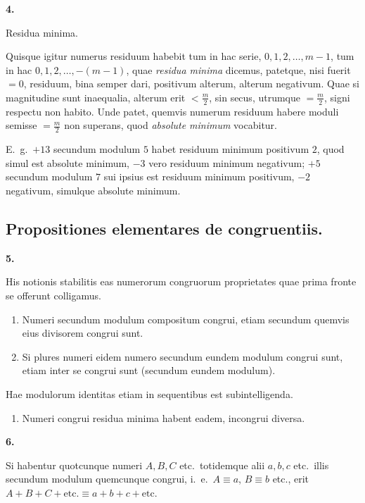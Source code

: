 \documentclass[12pt,a4paper]{article}
\theoremstyle{plain}
\theoremstyle{definition}
\theoremstyle{remark}
\begin{document}
\vspace{0.5em}
\textbf{4.}

Residua minima.

Quisque igitur numerus residuum habebit tum in hac serie, $0, 1, 2, \ldots, m - 1$, tum in hac $0, 1, 2, \ldots, -(m-1)$, quae \emph{residua minima} dicemus, patetque, nisi fuerit $= 0$, residuum, bina semper dari, positivum alterum, alterum negativum. Quae si magnitudine sunt inaequalia, alterum erit $< \frac{m}{2}$, sin secus, utrumque $= \frac{m}{2}$, signi respectu non habito. Unde patet, quemvis numerum residuum habere moduli semisse $= \frac{m}{2}$ non superans, quod \emph{absolute minimum} vocabitur.

E.~g.\ $+13$ secundum modulum $5$ habet residuum minimum positivum $2$, quod simul est absolute minimum, $-3$ vero residuum minimum negativum; $+5$ secundum modulum $7$ sui ipsius est residuum minimum positivum, $-2$ negativum, simulque absolute minimum.

\vspace{0.5em}
\subsection*{Propositiones elementares de congruentiis.}

\textbf{5.}

His notionis stabilitis eas numerorum congruorum proprietates quae prima fronte se offerunt colligamus.

\begin{enumerate}[label=\arabic*.]
\item Numeri secundum modulum compositum congrui, etiam secundum quemvis eius divisorem congrui sunt.
\item Si plures numeri eidem numero secundum eundem modulum congrui sunt, etiam inter se congrui sunt (secundum eundem modulum).
\end{enumerate}
Hae modulorum identitas etiam in sequentibus est subintelligenda.

\begin{enumerate}[label=\arabic*., resume]
\item Numeri congrui residua minima habent eadem, incongrui diversa.
\end{enumerate}

\textbf{6.}

Si habentur quotcunque numeri $A, B, C$ etc.\ totidemque alii $a, b, c$ etc.\ illis secundum modulum quemcunque congrui, i.~e.\ $A \equiv a$, $B \equiv b$ etc., erit $A + B + C + \text{etc.} \equiv a + b + c + \text{etc.}$
\end{document}
